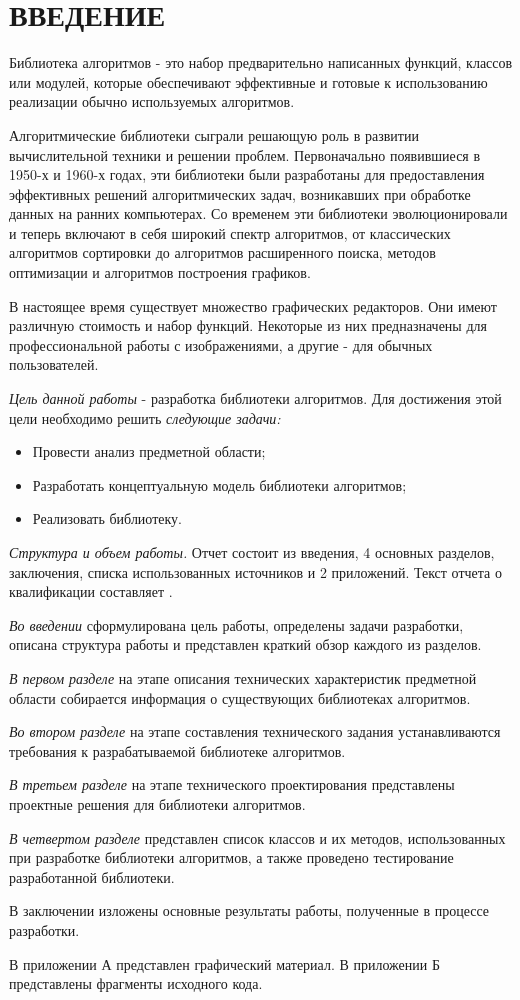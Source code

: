 \section*{ВВЕДЕНИЕ}
Библиотека алгоритмов - это набор предварительно написанных функций, классов или модулей, которые обеспечивают эффективные и готовые к использованию реализации обычно используемых алгоритмов.

Алгоритмические библиотеки сыграли решающую роль в развитии вычислительной техники и решении проблем. Первоначально появившиеся в 1950-х и 1960-х годах, эти библиотеки были разработаны для предоставления эффективных решений алгоритмических задач, возникавших при обработке данных на ранних компьютерах. Со временем эти библиотеки эволюционировали и теперь включают в себя широкий спектр алгоритмов, от классических алгоритмов сортировки до алгоритмов расширенного поиска, методов оптимизации и алгоритмов построения графиков.

В настоящее время существует множество графических редакторов. Они имеют различную стоимость и набор функций. Некоторые из них предназначены для профессиональной работы с изображениями, а другие - для обычных пользователей.

\emph{Цель данной работы} - разработка библиотеки алгоритмов. Для достижения этой цели необходимо решить \emph{следующие задачи:}
\begin{itemize}
	\item Провести анализ предметной области;
	\item Разработать концептуальную модель библиотеки алгоритмов;
	\item Реализовать библиотеку.
\end{itemize}

\emph{Структура и объем работы.} Отчет состоит из введения, 4 основных разделов, заключения, списка использованных источников и 2 приложений. Текст отчета о квалификации составляет .

\emph{Во введении} сформулирована цель работы, определены задачи разработки, описана структура работы и представлен краткий обзор каждого из разделов.

\emph{В первом разделе} на этапе описания технических характеристик предметной области собирается информация о существующих библиотеках алгоритмов.

\emph{Во втором разделе} на этапе составления технического задания устанавливаются требования к разрабатываемой библиотеке алгоритмов.

\emph{В третьем разделе} на этапе технического проектирования представлены проектные решения для библиотеки алгоритмов.

\emph{В четвертом разделе} представлен список классов и их методов, использованных при разработке библиотеки алгоритмов, а также проведено тестирование разработанной библиотеки.

В заключении изложены основные результаты работы, полученные в процессе разработки.

В приложении А представлен графический материал.
В приложении Б представлены фрагменты исходного кода.





